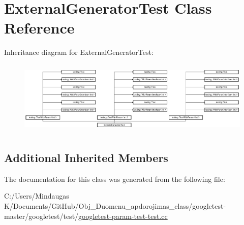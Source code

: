 \hypertarget{class_external_generator_test}{}\section{External\+Generator\+Test Class Reference}
\label{class_external_generator_test}
Inheritance diagram for External\+Generator\+Test\+:\begin{figure}[H]
\begin{center}
\leavevmode
\includegraphics[height=3.572568cm]{d0/d4f/class_external_generator_test}
\end{center}
\end{figure}
\subsection*{Additional Inherited Members}


The documentation for this class was generated from the following file\+:\begin{DoxyCompactItemize}
\item 
C\+:/\+Users/\+Mindaugas K/\+Documents/\+Git\+Hub/\+Obj\+\_\+\+Duomenu\+\_\+apdorojimas\+\_\+class/googletest-\/master/googletest/test/\mbox{\hyperlink{googletest-master_2googletest_2test_2googletest-param-test-test_8cc}{googletest-\/param-\/test-\/test.\+cc}}\end{DoxyCompactItemize}
